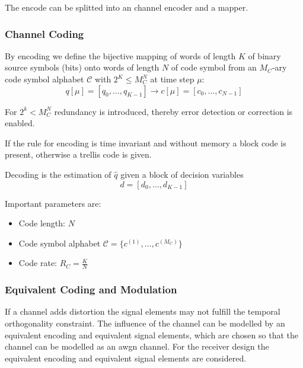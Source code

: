 The encode can be splitted into an channel encoder and a mapper.

\subsubsection{Channel Coding}
By encoding we define the bijective mapping of words of length $K$ of binary source symbols
(bits) onto words of length $N$ of code symbol from an $M_C$-ary code symbol alphabet
$\mathcal{C}$ with $2^K \leq M_C^N$ at time step $\mu$:
\begin{equation}
    q[\mu] = [q_0, \ldots, q_{K-1}] \to c[\mu] = [c_0, \ldots, c_{N-1}]
\end{equation}

For $2^k < M_C^N$ redundancy is introduced, thereby error detection or correction is enabled.

If the rule for encoding is time invariant and without memory a block code is present,
otherwise a trellis code is given.

Decoding is the estimation of $\hat{q}$ given a block of decision variables
\begin{equation}
    d = [d_0, \ldots, d_{K-1}]
\end{equation} 

Important parameters are:
\begin{itemize}
    \item Code length: $N$
    \item Code symbol alphabet $\mathcal{C} = \{c^{(1)}, \ldots, c^{(M_C)}\}$
    \item Code rate: $R_C = \frac{K}{N}$
\end{itemize}

\subsubsection{Equivalent Coding and Modulation}
If a channel adds distortion the signal elements may not fulfill the temporal
orthogonality constraint. The influence of the channel can be modelled by an
equivalent encoding and equivalent signal elements, which are chosen so
that the channel can be modelled as an \ac{awgn} channel. For the receiver design
the equivalent encoding and equivalent signal elements are considered.


